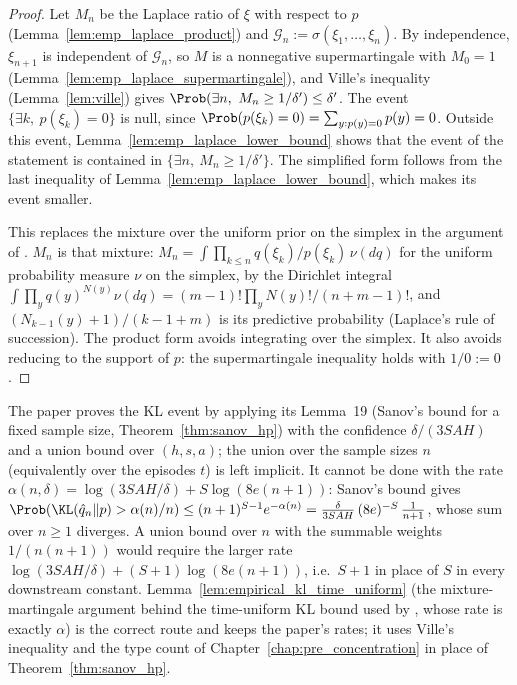 \begin{proof}
\leanok
{}
Let $M_n$ be the Laplace ratio of $\xi$ with respect to $p$ (Lemma~\ref{lem:emp_laplace_product})
and $\mathcal G_n := \sigma(\xi_1, \dots, \xi_n)$. By independence, $\xi_{n+1}$ is independent of
$\mathcal G_n$, so $M$ is a nonnegative supermartingale with $M_0 = 1$
(Lemma~\ref{lem:emp_laplace_supermartingale}), and Ville's inequality (Lemma~\ref{lem:ville})
gives $\Prob(\exists n,\ M_n \ge 1/\delta') \le \delta'$. The event
$\{\exists k,\ p(\xi_k) = 0\}$ is null, since $\Prob(p(\xi_k) = 0) = \sum_{y : p(y) = 0} p(y) = 0$.
Outside this event, Lemma~\ref{lem:emp_laplace_lower_bound} shows that the event of the statement
is contained in $\{\exists n,\ M_n \ge 1/\delta'\}$. The simplified form follows from the last
inequality of Lemma~\ref{lem:emp_laplace_lower_bound}, which makes its event smaller.

This replaces the mixture over the uniform prior on the simplex in the argument of
\cite{menard2021fast}. $M_n$ is that mixture:
$M_n = \int \prod_{k \le n} q(\xi_k)/p(\xi_k)\, \nu(dq)$ for the uniform probability measure $\nu$
on the simplex, by the Dirichlet integral
$\int \prod_y q(y)^{N(y)} \nu(dq) = (m - 1)! \prod_y N(y)!/(n + m - 1)!$, and
$(N_{k-1}(y) + 1)/(k - 1 + m)$ is its predictive probability (Laplace's rule of succession).
The product form avoids integrating over the simplex. It also avoids reducing to the support of
$p$: the supermartingale inequality holds with $1/0 := 0$.
\end{proof}

\begin{remark}\label{rem:empirical_sanov_union}
The paper proves the KL event by applying its Lemma~19 (Sanov's bound for a fixed sample size,
Theorem~\ref{thm:sanov_hp}) with the confidence $\delta/(3SAH)$ and a union bound over
$(h, s, a)$; the union over the sample sizes $n$ (equivalently over the episodes $t$) is left
implicit. It cannot be done with the rate $\alpha(n, \delta) = \log(3SAH/\delta) + S \log(8e(n + 1))$:
Sanov's bound gives $\Prob(\KL(\hat q_n \| p) > \alpha(n)/n) \le (n + 1)^{S - 1} e^{-\alpha(n)} = \frac{\delta}{3SAH}\,(8e)^{-S}\,\frac{1}{n + 1}$,
whose sum over $n \ge 1$ diverges. A union bound over $n$ with the summable weights
$1/(n(n + 1))$ would require the larger rate $\log(3SAH/\delta) + (S + 1)\log(8e(n + 1))$, i.e.\
$S + 1$ in place of $S$ in every downstream constant. Lemma~\ref{lem:empirical_kl_time_uniform}
(the mixture-martingale argument behind the time-uniform KL bound used by
\cite{menard2021fast}, whose rate is exactly $\alpha$) is the correct route and keeps the paper's
rates; it uses Ville's inequality and the type count of Chapter~\ref{chap:pre_concentration}
in place of Theorem~\ref{thm:sanov_hp}.
\end{remark}


